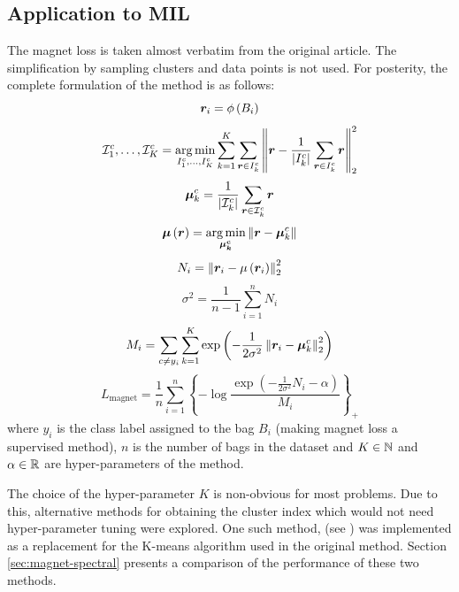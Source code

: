 \subsection{Application to MIL}
The magnet loss is taken almost verbatim from the original article. The simplification by sampling clusters and data points is not used. For posterity, the complete formulation of the method is as follows:
\[ \bm{r}_i = \phi \left( B_i \right) \]
\[ \mathcal{I}_1^c, \dots, \mathcal{I}_K^c = \operatorname*{arg\,min}_{I_1^c, \dots, I_K^c} \sum_{k = 1}^K \sum_{\bm{r} \in I_k^c} \left\lVert \bm{r} - \frac{1}{\left\lvert I_k^c \right\rvert} \sum_{\bm{r} \in I_k^c} \bm{r} \right\rVert_2^2  \]
\[ \bm{\mu}_k^c = \frac{1}{\left\lvert \mathcal{I}_k^c \right\rvert} \sum_{\bm{r} \in \mathcal{I}_k^c} \bm{r} \]
\[ \bm{\mu} \left( \bm{r} \right) = \operatorname*{arg\,min}_{\bm{\mu_k^c}} \left\lVert \bm{r} - \bm{\mu}_k^c \right\rVert \]
\[ N_i = \left\lVert \bm{r}_i - \mu \left( \bm{r}_i \right) \right\rVert_2^2 \]
\[ \sigma^2 = \frac{1}{n - 1} \sum_{i = 1}^n N_i \]
\[ M_i = \sum_{c \neq y_i} \sum_{k = 1}^K \exp \left( - \frac{1}{2 \sigma^2} \left\lVert \bm{r}_i - \bm{\mu}_k^c \right\rVert_2^2 \right) \]
\[ L_\mathrm{magnet} = \frac{1}{n} \sum_{i = 1}^n \left\{ - \log \frac{\exp \left( - \frac{1}{2 \sigma^2} N_i - \alpha \right)}{M_i} \right\}_+ \]
where \( y_i \) is the class label assigned to the bag \( B_i \) (making magnet loss a supervised method), \( n \) is the number of bags in the dataset and \( K \in \mathbb{N} \) and \( \alpha \in \mathbb{R} \) are hyper-parameters of the method.

The choice of the hyper-parameter \( K \) is non-obvious for most problems. Due to this, alternative methods for obtaining the cluster index which would not need hyper-parameter tuning were explored. One such method,  (see \cite{zelnik-manor_self-tuning_2005}) was implemented as a replacement for the K-means algorithm used in the original method. Section \ref{sec:magnet-spectral} presents a comparison of the performance of these two methods.

